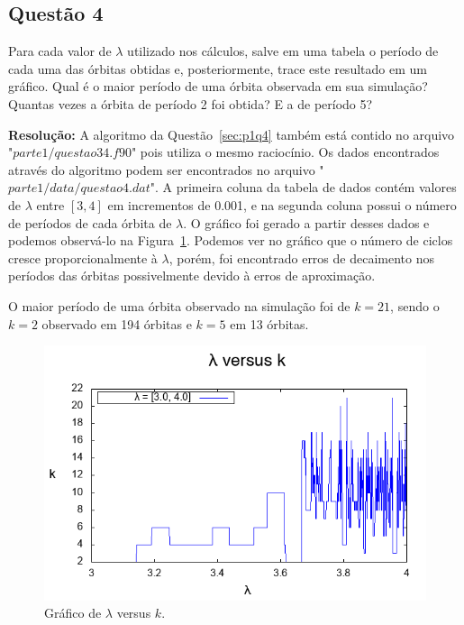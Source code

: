 \documentclass[12pt]{article}
\begin{document}
\subsection*{Questão 4}
\label{sec:p1q4}
Para cada valor de $\lambda$ utilizado nos cálculos, salve em uma tabela o período de cada uma das órbitas obtidas e, posteriormente, trace este resultado em um gráfico. Qual é o maior período de uma órbita observada em sua simulação? Quantas vezes a órbita de período 2 foi obtida? E a de período 5?

\textbf{Resolução:}
A algoritmo da Questão~\ref{sec:p1q4} também está contido no arquivo "$\textit{parte1/questao34.f90}$" pois utiliza o mesmo raciocínio. Os dados encontrados através do algoritmo podem ser encontrados no arquivo "$\textit{parte1/data/questao4.dat}$". A primeira coluna da tabela de dados contém valores de $\lambda$ entre $[3, 4]$ em incrementos de 0.001, e na segunda coluna possui o número de períodos de cada órbita de $\lambda$. O gráfico foi gerado a partir desses dados e podemos observá-lo na Figura~\ref{fig:p1q4}. Podemos ver no gráfico que o número de ciclos cresce proporcionalmente à $\lambda$, porém, foi encontrado erros de decaimento nos períodos das órbitas possivelmente devido à erros de aproximação.

O maior período de uma órbita observado na simulação foi de $k = 21$, sendo o $k = 2$ observado em 194 órbitas e $k = 5$ em 13 órbitas.

\begin{figure}[H]
	\centering
	\includegraphics[width=1\textwidth]{p1q4.png}
	\caption{Gráfico de $\lambda$ versus $k$.}
	\label{fig:p1q4}
\end{figure}
\end{document}
